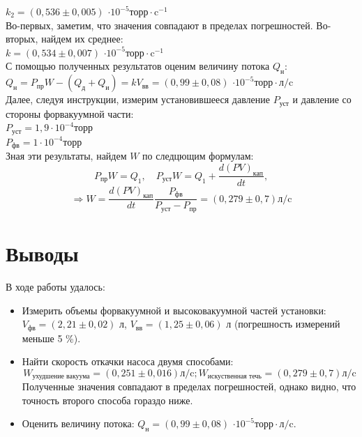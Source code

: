 \documentclass[a4paper, 12pt]{article}
\begin{document}
$k_2 = (0,536 \pm 0,005)$ $\cdot 10^{-5} \text{торр} \cdot \text{c}^{-1}$\\
Во-первых, заметим, что значения совпадают в пределах погрешностей. Во-вторых, найдем их среднее:\\
$k = (0,534 \pm 0,007)$ $\cdot 10^{-5} \text{торр} \cdot \text{c}^{-1}$\\
С помощью полученных результатов оценим величину потока $Q_{\text{н}}$:\\
$Q_{\text{н}} = P_{\text{пр}}W - (Q_{\text{д}} + Q_{\text{и}}) = kV_{\text{вв}} = (0,99 \pm 0,08)$ $\cdot 10^{-5} \text{торр} \cdot \text{л/c}$\\

Далее, следуя инструкции, измерим установившееся давление $P_{\text{уст}}$ и давление со стороны форвакуумной части:\\
$P_{\text{уст}} =  1,9 \cdot 10^{-4} \text{торр}$\\
$P_{\text{фв}} =  1 \cdot 10^{-4} \text{торр}$\\
Зная эти результаты, найдем $W$ по следцющим формулам:\\
$$
P_{пр} W = Q_1, \quad P_{уст} W = Q_1 + \frac{d(PV)_{кап}}{dt}, 
$$
$$
\Rightarrow
W = \frac{d(PV)_{\text{кап}}}{dt}\frac{P_{\text{фв}}}{P_{\text{уст}}-P_{\text{пр}}} = (0,279 \pm 0,7) \text{л/c}
$$
\newpage
\section{Выводы}
В ходе работы удалось:
\begin{itemize}
    \item Измерить объемы форвакуумной и высоковакуумной частей установки: $V_{\text{фв}} = (2,21 \pm 0,02) \text{ л}$, $ V_{\text{вв}} = (1,25 \pm 0,06) \text{ л}$ (погрешность измерений меньше 5 \%).
    \item Найти скорость откачки насоса двумя способами:
    \begin{equation*}
        W_{\text{ухудшение вакуума}} = (0,251 \pm 0,016)\text{л/c}; W_{\text{искуственная течь}} = (0,279 \pm 0,7)\text{л/c}
    \end{equation*}
    Полученные значения совпадают в пределах погрешностей, однако видно, что точность второго способа гораздо ниже.
    \item Оценить величину потока: $Q_{\text{н}} = (0,99 \pm 0,08)$ $\cdot 10^{-5} \text{торр} \cdot \text{л/c}$.
\end{itemize}
\end{document}
